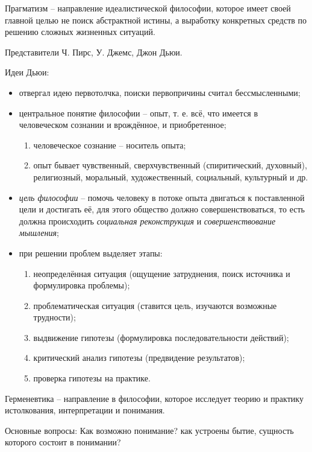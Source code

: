 
Прагматизм -- направление идеалистической философии, которое имеет своей главной целью не поиск абстрактной истины, а выработку конкретных средств по решению сложных жизненных ситуаций.

Представители Ч. Пирс, У. Джемс, Джон Дьюи.  

Идеи Дьюи:
\begin{itemize}
	\item отвергал идею первотолчка, поиски первопричины считал бессмысленными;
	\item центральное понятие философии -- опыт, т. е. всё, что имеется в человеческом сознании и врождённое, и приобретенное;
	\begin{enumerate}
		\item человеческое сознание -- носитель опыта;
		\item опыт бывает чувственный, сверхчувственный (спиритический, духовный), религиозный, моральный, художественный, социальный, культурный и др.
	\end{enumerate} 
	\item \textit{цель философии} -- помочь человеку в потоке опыта двигаться к поставленной цели и достигать её, для этого общество должно совершенствоваться, то есть должна происходить \textit{социальная реконструкция} и \textit{совершенствование мышления};
	\item при решении проблем выделяет этапы:
	\begin{enumerate}
		\item неопределённая ситуация (ощущение затруднения, поиск источника и формулировка проблемы);
		\item проблематическая ситуация (ставится цель, изучаются возможные трудности);
		\item выдвижение гипотезы (формулировка последовательности действий);
		\item критический анализ гипотезы (предвидение результатов);
		\item проверка гипотезы на практике.
	\end{enumerate}
\end{itemize}

Герменевтика -- направление в философии, которое исследует теорию и практику истолкования, интерпретации и понимания.

Основные вопросы: Как возможно понимание? как устроены бытие, сущность которого состоит в понимании?

